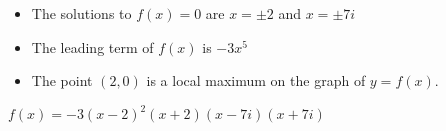 {\begin{itemize}

\item The solutions to $f(x) = 0$ are $x = \pm 2$ and $x=\pm 7i$
\item The leading term of $f(x)$ is $-3x^5$
\item The point $(2,0)$ is a local maximum on the graph of $y=f(x)$.

\end{itemize}}
{$f(x) = -3(x-2)^2(x+2)(x-7i)(x+7i)$}